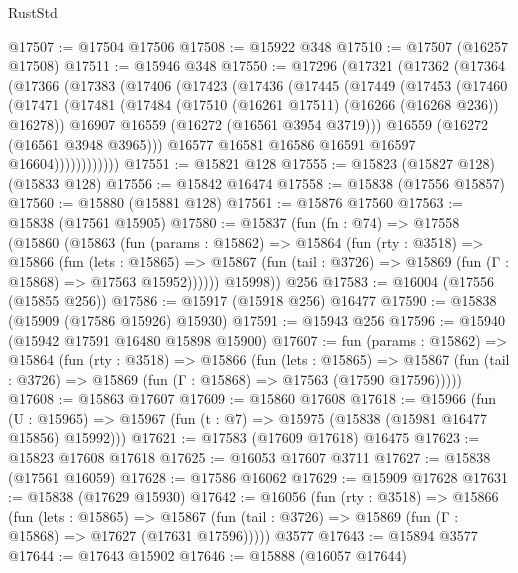 \begin{lexlean}{RustStd}
\begin{coremodule}
@17507 := @17504 @17506
@17508 := @15922 @348
@17510 := @17507 (@16257 @17508)
@17511 := @15946 @348
@17550 := @17296
    (@17321
      (@17362
        (@17364
          (@17366
            (@17383
              (@17406
                (@17423
                  (@17436
                    (@17445
                      (@17449
                        (@17453
                          (@17460
                            (@17471
                              (@17481
                                (@17484 (@17510 (@16261 @17511) (@16266 (@16268 @236)) @16278))
                                @16907
                                @16559
                                (@16272 (@16561 @3954 @3719)))
                              @16559
                              (@16272 (@16561 @3948 @3965)))
                            @16577
                            @16581
                            @16586
                            @16591
                            @16597
                            @16604))))))))))))
@17551 := @15821 @128
@17555 := @15823 (@15827 @128) (@15833 @128)
@17556 := @15842 @16474
@17558 := @15838 (@17556 @15857)
@17560 := @15880 (@15881 @128)
@17561 := @15876 @17560
@17563 := @15838 (@17561 @15905)
@17580 := @15837
    (fun (fn : @74) =>
    @17558
      (@15860
        (@15863
          (fun (params : @15862) =>
          @15864
            (fun (rty : @3518) =>
            @15866
              (fun (lets : @15865) =>
              @15867 (fun (tail : @3726) => @15869 (fun (Γ : @15868) => @17563 @15952))))))
        @15998))
    @256
@17583 := @16004 (@17556 (@15855 @256))
@17586 := @15917 (@15918 @256) @16477
@17590 := @15838 (@15909 (@17586 @15926) @15930)
@17591 := @15943 @256
@17596 := @15940 (@15942 @17591 @16480 @15898 @15900)
@17607 := fun (params : @15862) =>
  @15864
    (fun (rty : @3518) =>
    @15866
      (fun (lets : @15865) =>
      @15867 (fun (tail : @3726) => @15869 (fun (Γ : @15868) => @17563 (@17590 @17596)))))
@17608 := @15863 @17607
@17609 := @15860 @17608
@17618 := @15966
    (fun (U : @15965) => @15967 (fun (t : @7) => @15975 (@15838 (@15981 @16477 @15856) @15992)))
@17621 := @17583 (@17609 @17618) @16475
@17623 := @15823 @17608 @17618
@17625 := @16053 @17607 @3711
@17627 := @15838 (@17561 @16059)
@17628 := @17586 @16062
@17629 := @15909 @17628
@17631 := @15838 (@17629 @15930)
@17642 := @16056
    (fun (rty : @3518) =>
    @15866
      (fun (lets : @15865) =>
      @15867 (fun (tail : @3726) => @15869 (fun (Γ : @15868) => @17627 (@17631 @17596)))))
    @3577
@17643 := @15894 @3577
@17644 := @17643 @15902
@17646 := @15888 (@16057 @17644)

\end{coremodule}
\end{lexlean}
